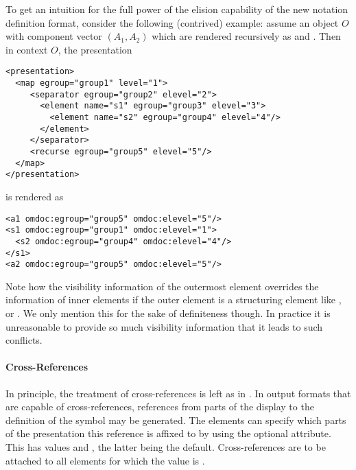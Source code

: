 To get an intuition for the full power of the elision capability of the new notation
definition format, consider the following (contrived) example: assume an object $O$ with
component vector $(A_1,A_2)$ which are rendered recursively as {} and
{}. Then in context $O$, the
presentation
\begin{lstlisting}[mathescape]
<presentation>
  <map egroup="group1" level="1">
     <separator egroup="group2" elevel="2">
       <element name="s1" egroup="group3" elevel="3">
         <element name="s2" egroup="group4" elevel="4"/>
       </element>
     </separator>
     <recurse egroup="group5" elevel="5"/>
  </map>
</presentation>
\end{lstlisting}
is rendered as
\begin{lstlisting}[mathescape]
<a1 omdoc:egroup="group5" omdoc:elevel="5"/>
<s1 omdoc:egroup="group1" omdoc:elevel="1">
  <s2 omdoc:egroup="group4" omdoc:elevel="4"/>
</s1>
<a2 omdoc:egroup="group5" omdoc:elevel="5"/>
\end{lstlisting}
Note how the visibility information of the outermost element overrides the information of
inner elements if the outer element is a structuring element like {},
{} or {}. We only mention this for the sake of
definiteness though. In practice it is unreasonable to provide so much visibility
information that it leads to such conflicts.


\paragraph{Cross-References}
In principle, the treatment of cross-references is left as in {}. In output
formats that are capable of cross-references, references from parts of the display to the
definition of the symbol may be generated. The {} elements can
specify which parts of the presentation this reference is affixed to by using the optional
{} attribute. This has values {}
and {}, the latter being the default. Cross-references are to
be attached to all elements for which the value is {}.



